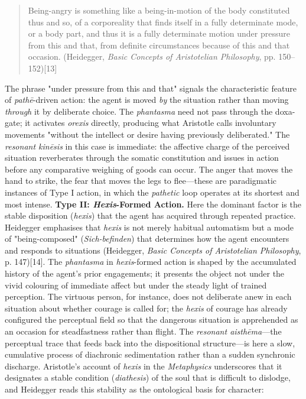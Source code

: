 \documentclass{article}
\begin{document}
\begin{quote}
Being-angry is something like a being-in-motion of the body constituted thus and so, of a corporeality that finds itself in a fully determinate mode, or a body part, and thus it is a fully determinate motion under pressure from this and that, from definite circumstances because of this and that occasion. (Heidegger, \textit{Basic Concepts of Aristotelian Philosophy}, pp. 150--152)[13]
\end{quote} The phrase "under pressure from this and that" signals the characteristic feature of \textit{pathē}-driven action: the agent is moved \textit{by} the situation rather than moving \textit{through} it by deliberate choice. The \textit{phantasma} need not pass through the doxa-gate; it activates \textit{orexis} directly, producing what Aristotle calls involuntary movements "without the intellect or desire having previously deliberated." The \textit{resonant kinēsis} in this case is immediate: the affective charge of the perceived situation reverberates through the somatic constitution and issues in action before any comparative weighing of goods can occur. The anger that moves the hand to strike, the fear that moves the legs to flee---these are paradigmatic instances of Type I action, in which the \textit{pathetic} loop operates at its shortest and most intense. \textbf{Type II: \textit{Hexis}-Formed Action.} Here the dominant factor is the stable disposition (\textit{hexis}) that the agent has acquired through repeated practice. Heidegger emphasises that \textit{hexis} is not merely habitual automatism but a mode of "being-composed" (\textit{Sich-befinden}) that determines how the agent encounters and responds to situations (Heidegger, \textit{Basic Concepts of Aristotelian Philosophy}, p. 147)[14]. The \textit{phantasma} in \textit{hexis}-formed action is shaped by the accumulated history of the agent's prior engagements; it presents the object not under the vivid colouring of immediate affect but under the steady light of trained perception. The virtuous person, for instance, does not deliberate anew in each situation about whether courage is called for; the \textit{hexis} of courage has already configured the perceptual field so that the dangerous situation is apprehended as an occasion for steadfastness rather than flight. The \textit{resonant aisthēma}---the perceptual trace that feeds back into the dispositional structure---is here a slow, cumulative process of diachronic sedimentation rather than a sudden synchronic discharge. Aristotle's account of \textit{hexis} in the \textit{Metaphysics} underscores that it designates a stable condition (\textit{diathesis}) of the soul that is difficult to dislodge, and Heidegger reads this stability as the ontological basis for character: \begin{quote}

\end{quote}
\end{document}
